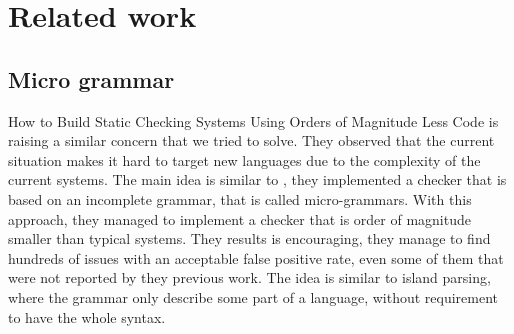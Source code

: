 \section{Related work}
\label{sec:related_work}

\subsection{Micro grammar}
\label{subsec:micro_grammar}

How to Build Static Checking Systems Using Orders of Magnitude Less Code \cite{Brown:2016:BSC:2954679.2872364} is raising a similar concern that we tried to solve. 
They observed that the current situation makes it hard to target new languages due to the complexity of the current systems. 
The main idea is similar to \slang{}, they implemented a checker that is based on an incomplete grammar, that is called micro-grammars.
With this approach, they managed to implement a checker that is order of magnitude smaller than typical systems.
They results is encouraging, they manage to find hundreds of issues with an acceptable false positive rate, even some of them that were not reported by they previous work. 
The idea is similar to island parsing, where the grammar only describe some part of a language, without requirement to have the whole syntax.